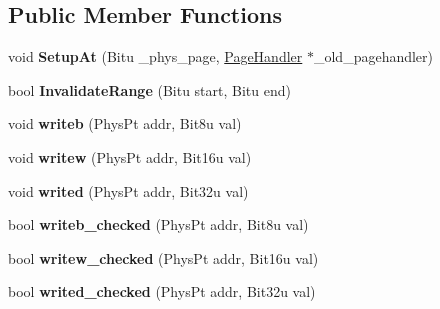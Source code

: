\subsection*{Public Member Functions}
\begin{DoxyCompactItemize}
\item 
\hypertarget{classCodePageHandlerDynRec_abd4257a626a57d4a30b87e59f10b37a6}{void {\bfseries Setup\-At} (Bitu \-\_\-phys\-\_\-page, \hyperlink{classPageHandler}{Page\-Handler} $\ast$\-\_\-old\-\_\-pagehandler)}\label{classCodePageHandlerDynRec_abd4257a626a57d4a30b87e59f10b37a6}

\item 
\hypertarget{classCodePageHandlerDynRec_a0ca46d47e0197c04a36b666a5d934a97}{bool {\bfseries Invalidate\-Range} (Bitu start, Bitu end)}\label{classCodePageHandlerDynRec_a0ca46d47e0197c04a36b666a5d934a97}

\item 
\hypertarget{classCodePageHandlerDynRec_a3ca70263704a951b7d1f90cbc1eec6f4}{void {\bfseries writeb} (Phys\-Pt addr, Bit8u val)}\label{classCodePageHandlerDynRec_a3ca70263704a951b7d1f90cbc1eec6f4}

\item 
\hypertarget{classCodePageHandlerDynRec_a6669060de6e8b6f59c01e8f19999ddea}{void {\bfseries writew} (Phys\-Pt addr, Bit16u val)}\label{classCodePageHandlerDynRec_a6669060de6e8b6f59c01e8f19999ddea}

\item 
\hypertarget{classCodePageHandlerDynRec_ad8db785cabeecc8a5d18bb813ad14832}{void {\bfseries writed} (Phys\-Pt addr, Bit32u val)}\label{classCodePageHandlerDynRec_ad8db785cabeecc8a5d18bb813ad14832}

\item 
\hypertarget{classCodePageHandlerDynRec_adb9e54a93b35db3ec11b1a426dddd557}{bool {\bfseries writeb\-\_\-checked} (Phys\-Pt addr, Bit8u val)}\label{classCodePageHandlerDynRec_adb9e54a93b35db3ec11b1a426dddd557}

\item 
\hypertarget{classCodePageHandlerDynRec_ad2180f56734407f897c5a81e64f674ac}{bool {\bfseries writew\-\_\-checked} (Phys\-Pt addr, Bit16u val)}\label{classCodePageHandlerDynRec_ad2180f56734407f897c5a81e64f674ac}

\item 
\hypertarget{classCodePageHandlerDynRec_a5c3f15616c10dd2da9a19d3da1edb0d6}{bool {\bfseries writed\-\_\-checked} (Phys\-Pt addr, Bit32u val)}\label{classCodePageHandlerDynRec_a5c3f15616c10dd2da9a19d3da1edb0d6}


\end{DoxyCompactItemize}
